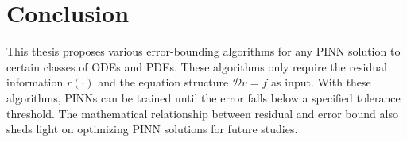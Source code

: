 \chapter{Conclusion} \label{chapter:conclusion}

This thesis proposes various error-bounding algorithms for any PINN solution to certain classes of ODEs and PDEs. 
These algorithms only require the residual information $r(\cdot)$ and the equation structure $\mathcal{D} v = f$ as input.
With these algorithms, PINNs can be trained until the error falls below a specified tolerance threshold.
The mathematical relationship between residual and error bound also sheds light on optimizing PINN solutions for future studies.